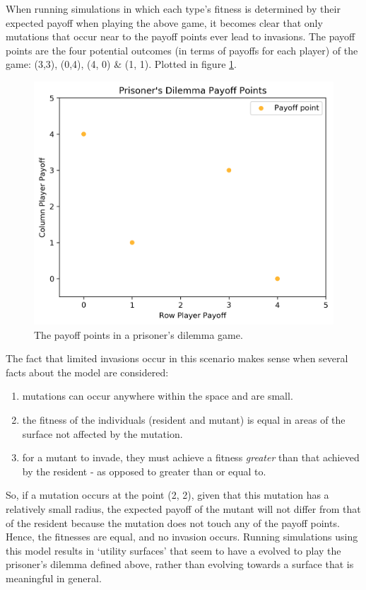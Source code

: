 \documentclass[11pt]{book}
\newcommand*{\np}{\par\noindent\newline}
\begin{document}
\np When running simulations in which each type's fitness is determined by their expected payoff when playing the above game,
it becomes clear that only mutations that occur near to the payoff points ever lead to invasions. 
The payoff points are the four potential outcomes (in terms of payoffs for each player) of the game: (3,3), (0,4), (4, 0) \& (1, 1).
Plotted in figure \ref{prisoners_payoff_plot}.
\begin{figure}
	\centering
	\includegraphics[scale=0.5]{resources/prisoners_dilemma_payoffs.png}
	\caption{The payoff points in a prisoner's dilemma game.}
	\label{prisoners_payoff_plot}
\end{figure}

\np The fact that limited invasions occur in this scenario makes sense when several facts about the model are considered:
\begin{enumerate}[label=(\alph*)]
	\item mutations can occur anywhere within the space and are small.
	\item the fitness of the individuals (resident and mutant) is equal in areas of the surface not affected by the mutation.
	\item for a mutant to invade, they must achieve a fitness \textit{greater} than that achieved by the resident - as opposed to greater than or equal to.	
\end{enumerate} 
\np
So, if a mutation occurs at the point (2, 2), given that this mutation has a relatively small radius, 
the expected payoff of the mutant will not differ from that of the resident because the mutation does not touch any of the payoff points.
Hence, the fitnesses are equal, and no invasion occurs.
Running simulations using this model results in `utility surfaces' that seem to have a evolved to play the prisoner's dilemma defined above,
rather than evolving towards a surface that is meaningful in general.
\end{document}
